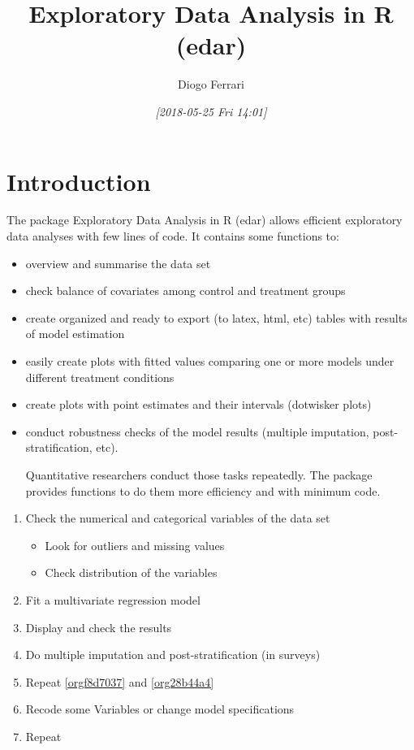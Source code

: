 \documentclass[a4paper]{article}
\author{Diogo Ferrari}
\date{\textit{[2018-05-25 Fri 14:01]}}
\title{Exploratory Data Analysis in R (edar)}
\begin{document}
\maketitle
\tableofcontents


\section{Introduction}
\label{sec:orgfea80a2}

The package Exploratory Data Analysis in R (edar) allows efficient exploratory data analyses with few lines of code. It contains some functions to:
\begin{itemize}
\item overview and summarise the data set
\item check balance of covariates among control and treatment groups
\item create organized and ready to export (to latex, html, etc) tables with results of model estimation
\item easily create plots with fitted values comparing one or more models under different treatment conditions
\item create plots with point estimates and their intervals (dotwisker plots)
\item conduct robustness checks of the model results (multiple imputation, post-stratification, etc). 

Quantitative researchers conduct those tasks repeatedly. The package provides functions to do them more efficiency and with minimum code.
\end{itemize}


\begin{enumerate}
\item Check the numerical and categorical variables of the data set
\begin{itemize}
\item Look for outliers and missing values
\item Check distribution of the variables
\end{itemize}
\item \label{orgf8d7037} Fit a multivariate regression model
\item \label{org28b44a4} Display and check the results
\item Do multiple imputation and post-stratification (in surveys)
\item Repeat \ref{orgf8d7037} and \ref{org28b44a4}
\item \label{org62899fa} Recode some Variables or change model specifications
\item Repeat
\end{enumerate}
\end{document}
